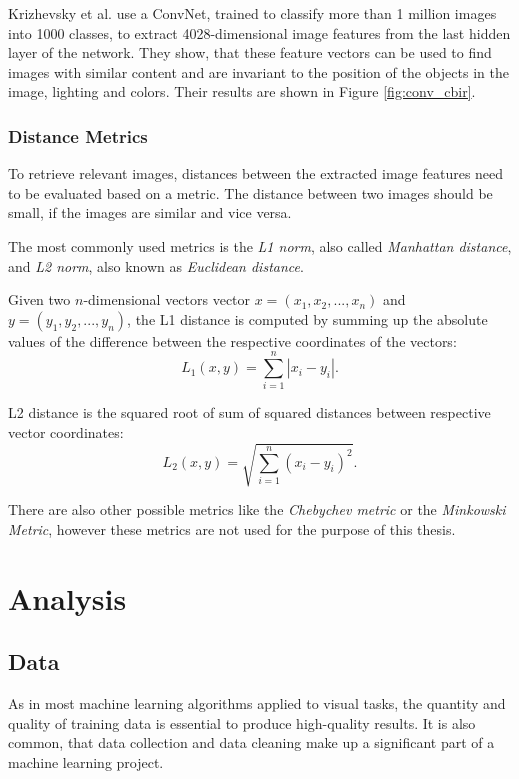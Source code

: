 \documentclass[12pt]{report}
\begin{document}
Krizhevsky et al. \cite{NIPS2012_4824} use a ConvNet, trained to classify more than 1 million images into 1000 classes, to extract 4028-dimensional image features from the last hidden layer of the network. They show, that these feature vectors can be used to find images with similar content and are invariant to the position of the objects in the image, lighting and colors. Their results are shown in Figure \ref{fig:conv_cbir}.


\pagebreak
\subsection{Distance Metrics}
To retrieve relevant images, distances between the extracted image features need to be evaluated based on a metric. The distance between two images should be small, if the images are similar and vice versa. 

The most commonly used metrics is the \textit{L1 norm}, also called \textit{Manhattan distance}, and \textit{L2 norm}, also known as \textit{Euclidean distance}.

Given two $n$-dimensional vectors vector $x = (x_1, x_2, ..., x_n)$ and $y = (y_1, y_2, ..., y_n)$, the L1 distance is computed by summing up the absolute values of the difference between the respective coordinates of the vectors:
\begin{equation}
L_1(x, y) = \sum_{i=1}^{n} |x_i - y_i|.
\end{equation} 

L2 distance is the squared root of sum of squared distances between respective vector coordinates:
\begin{equation}
L_2(x, y) = \sqrt{\sum_{i=1}^{n} (x_i - y_i)^2}.
\end{equation}

There are also other possible metrics like the \textit{Chebychev metric} or the \textit{Minkowski Metric}, however these metrics are not used for the purpose of this thesis. 


\pagebreak
\chapter{Analysis}

\section{Data} \label{sec:data}
As in most machine learning algorithms applied to visual tasks, the quantity and quality of training data is essential to produce high-quality results. It is also common, that data collection and data cleaning make up a significant part of a machine learning project.
\end{document}
